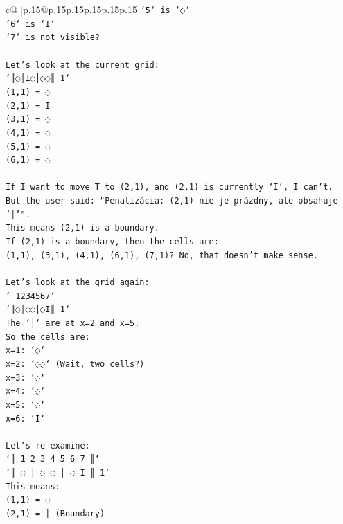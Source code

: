 \documentclass{article}
\begin{document}
{\begin{supertabular}{c@{$\;$}|p{.15\linewidth}@{}p{.15\linewidth}p{.15\linewidth}p{.15\linewidth}p{.15\linewidth}p{.15\linewidth}}
{{{\texttt{`5` is `◌`} \\
\texttt{`6` is `I`} \\
\texttt{`7` is not visible?} \\
\\ 
\texttt{Let's look at the current grid:} \\
\texttt{`║◌│I◌│◌◌║ 1`} \\
\texttt{(1,1) = ◌} \\
\texttt{(2,1) = I} \\
\texttt{(3,1) = ◌} \\
\texttt{(4,1) = ◌} \\
\texttt{(5,1) = ◌} \\
\texttt{(6,1) = ◌} \\
\\ 
\texttt{If I want to move T to (2,1), and (2,1) is currently `I`, I can't.} \\
\texttt{But the user said: "Penalizácia: (2,1) nie je prázdny, ale obsahuje '│'".} \\
\texttt{This means (2,1) is a boundary.} \\
\texttt{If (2,1) is a boundary, then the cells are:} \\
\texttt{(1,1), (3,1), (4,1), (6,1), (7,1)? No, that doesn't make sense.} \\
\\ 
\texttt{Let's look at the grid again:} \\
\texttt{` 1234567`} \\
\texttt{`║◌│◌◌│◌I║ 1`} \\
\texttt{The `│` are at x=2 and x=5.} \\
\texttt{So the cells are:} \\
\texttt{x=1: `◌`} \\
\texttt{x=2: `◌◌` (Wait, two cells?)} \\
\texttt{x=3: `◌`} \\
\texttt{x=4: `◌`} \\
\texttt{x=5: `◌`} \\
\texttt{x=6: `I`} \\
\\ 
\texttt{Let's re{-}examine:} \\
\texttt{`║ 1 2 3 4 5 6 7 ║`} \\
\texttt{`║ ◌ │ ◌ ◌ │ ◌ I ║ 1`} \\
\texttt{This means:} \\
\texttt{(1,1) = ◌} \\
\texttt{(2,1) = │ (Boundary)} \\
}}}
\end{supertabular}}
\end{document}
